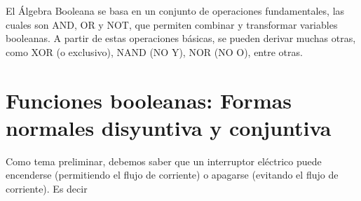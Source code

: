 El Álgebra Booleana se basa en un conjunto de operaciones fundamentales, las cuales son AND, OR y NOT, que permiten combinar y transformar variables booleanas. A partir de estas operaciones básicas, se pueden derivar muchas otras, como XOR (o exclusivo), NAND (NO Y), NOR (NO O), entre otras.

\newpage

\section{Funciones booleanas: Formas normales disyuntiva y conjuntiva}

Como tema preliminar, debemos saber que un interruptor eléctrico puede encenderse (permitiendo el flujo de corriente) o apagarse (evitando el flujo de corriente). Es decir

